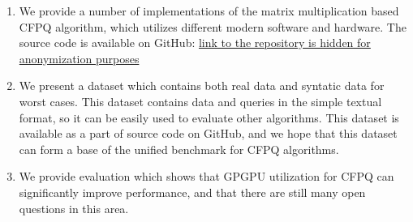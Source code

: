 \begin{enumerate}
\item We provide a number of implementations of the matrix multiplication based CFPQ algorithm, which utilizes different modern software and hardware.
The source code is available on GitHub: \href{link to the repository is hidden for anonymization purposes}{link to the repository is hidden for anonymization purposes} 
\item We present a dataset which contains both real data and syntatic data for worst cases.
This dataset contains data and queries in the simple textual format, so it can be easily used to evaluate other algorithms.
This dataset is available as a part of source code on GitHub, and we hope that this dataset can form a base of the unified benchmark for CFPQ algorithms.
\item We provide evaluation which shows that GPGPU utilization for CFPQ can significantly improve performance, and that there are still many open questions in this area.
\end{enumerate}
